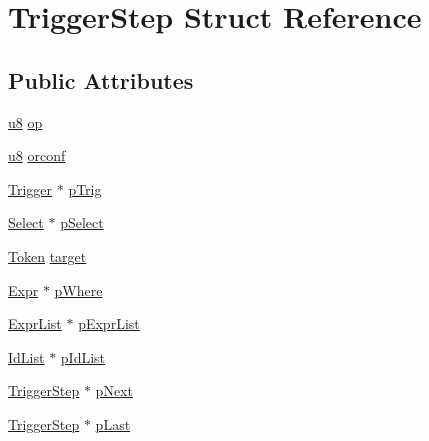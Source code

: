 \hypertarget{struct_trigger_step}{\section{Trigger\-Step Struct Reference}
\label{struct_trigger_step}
}
\subsection*{Public Attributes}
\begin{DoxyCompactItemize}
\item 
\hyperlink{sqlite3_8c_a74a0f6424ae628af25f23f0a35f6ead3}{u8} \hyperlink{struct_trigger_step_a20269855c80d869d498fcb93401832fd}{op}
\item 
\hyperlink{sqlite3_8c_a74a0f6424ae628af25f23f0a35f6ead3}{u8} \hyperlink{struct_trigger_step_a4ed8b2571fde96e84f637184453e73e3}{orconf}
\item 
\hyperlink{struct_trigger}{Trigger} $\ast$ \hyperlink{struct_trigger_step_a70671e85796776db06c732ab6ae4ae0d}{p\-Trig}
\item 
\hyperlink{struct_select}{Select} $\ast$ \hyperlink{struct_trigger_step_a90bf3353653cedf364a7fb2eb89a19c4}{p\-Select}
\item 
\hyperlink{struct_token}{Token} \hyperlink{struct_trigger_step_a8b860bb5f466b1522125d446b58d860a}{target}
\item 
\hyperlink{struct_expr}{Expr} $\ast$ \hyperlink{struct_trigger_step_ad4c293b04dfda535f3aad5b9e02726c7}{p\-Where}
\item 
\hyperlink{struct_expr_list}{Expr\-List} $\ast$ \hyperlink{struct_trigger_step_a607602af65ecf6c7e6cac4ea8532ac1d}{p\-Expr\-List}
\item 
\hyperlink{struct_id_list}{Id\-List} $\ast$ \hyperlink{struct_trigger_step_a6b91bf578544104f8bd4bd5b958ddd8c}{p\-Id\-List}
\item 
\hyperlink{struct_trigger_step}{Trigger\-Step} $\ast$ \hyperlink{struct_trigger_step_a0757a0d22dbe2f7f57706014dd35759b}{p\-Next}
\item 
\hyperlink{struct_trigger_step}{Trigger\-Step} $\ast$ \hyperlink{struct_trigger_step_a0aae9ea7f436881c0e9e614476a69584}{p\-Last}
\end{DoxyCompactItemize}


